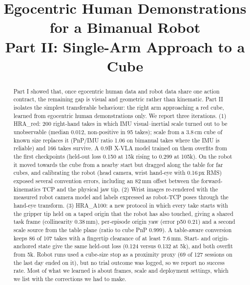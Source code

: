 \documentclass[conference,10pt]{IEEEtran}
\newcommand{\mm}{\,mm\xspace}
\begin{document}
\title{Egocentric Human Demonstrations for a Bimanual Robot\\Part II: Single-Arm Approach to a Cube}
\author{
}
\maketitle

\begin{abstract}
Part I showed that, once egocentric human data and robot data share one action contract, the remaining gap is visual and
geometric rather than kinematic. Part II isolates the simplest transferable behaviour: the right arm approaching a red cube,
learned from egocentric human demonstrations only. We report three iterations. (1) HRA\_red: 200 right-hand takes in which
IMU visual--inertial scale turned out to be unobservable (median 0.012, non-positive in 95 takes); scale from a 3.8\,cm cube
of known size replaces it (PnP/IMU ratio 1.06 on bimanual takes where the IMU is reliable) and 166 takes survive. A 0.9B X-VLA
model trained on them overfits from the first checkpoints (held-out loss 0.150 at 15k rising to 0.299 at 105k). On the robot
it moved towards the cube from a nearby start but dragged along the table for far cubes, and calibrating the robot
(head camera, wrist hand-eye with 0.16\,px RMS) exposed several convention errors, including an 82\mm offset between the
forward-kinematics TCP and the physical jaw tip. (2) Wrist images re-rendered with the measured robot camera model and
labels expressed as robot-TCP poses through the hand-eye transform. (3) HRA\_A100: a new protocol in which every take starts
with the gripper tip held on a taped origin that the robot has also touched, giving a shared task frame (collinearity
0.38\mm), per-episode origin yaw (error p50 0.21\textdegree) and a second scale source from the table plane (ratio to cube
PnP 0.999). A table-aware conversion keeps 86 of 107 takes with a fingertip clearance of at least 7.6\mm. Start- and
origin-anchored state give the same held-out loss (0.124 versus 0.132 at 5k), and both overfit from 5k. Robot runs used a
cube-size stop as a proximity proxy (69 of 127 sessions on the last day ended on it), but no trial outcome was logged, so we
report no success rate. Most of what we learned is about frames, scale and deployment settings, which we list with the
corrections we had to make.
\end{abstract}
\end{document}
